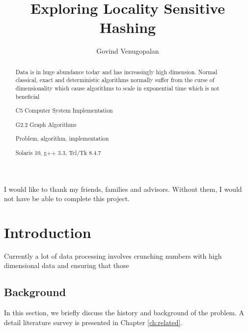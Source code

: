 \documentclass[fyp]{socreport}
\begin{document}
\title{Exploring Locality Sensitive Hashing}
\author{Govind Venugopalan}
\maketitle
\begin{abstract}
Data is in huge abundance today and has increasingly high dimension. Normal classical, exact and deterministic algorithms normally suffer from the curse of dimensionality which cause algorithms to scale in exponential time which is not beneficial

\begin{descriptors}
    \item C5 Computer System Implementation
	\item G2.2 Graph Algorithms
\end{descriptors}
\begin{keywords}
	Problem, algorithm, implementation
\end{keywords}
\begin{implement}
	Solaris 10, g++ 3.3, Tcl/Tk 8.4.7
\end{implement}
\end{abstract}

\begin{acknowledgement}
   I would like to thank my friends, families and advisors.
   Without them, I would not have be able to complete this project.
\end{acknowledgement}

\listoffigures 
\listoftables
\tableofcontents 

\chapter{Introduction}
\label{ch: intro}
Currently a lot of data processing involves crunching numbers with high dimensional data and ensuring that those 

\section{Background}
\label{sec : background}
In this section, we briefly discuss the history and background
of the problem.  A detail literature survey is presented in 
Chapter \ref{ch:related}.
\end{document}
